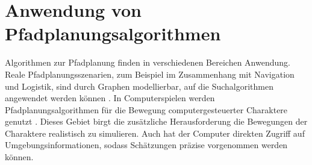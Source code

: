 

\chapter{Anwendung von Pfadplanungsalgorithmen}

Algorithmen zur Pfadplanung finden in verschiedenen Bereichen Anwendung. Reale Pfadplanungsszenarien, zum Beispiel im Zusammenhang mit Navigation und Logistik, sind durch Graphen modellierbar, auf die Suchalgorithmen angewendet werden können \cite{Botea.2011}. In Computerspielen werden Pfadplanungsalgorithmen für die Bewegung computergesteuerter Charaktere genutzt \cite[S.2]{Kri09}. Dieses Gebiet birgt die zusätzliche Herausforderung die Bewegungen der Charaktere realistisch zu simulieren. Auch hat der Computer direkten Zugriff auf Umgebungsinformationen, sodass Schätzungen präzise  vorgenommen werden können.

